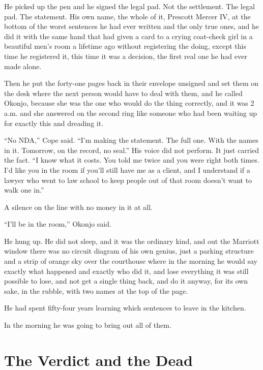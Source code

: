 \documentclass[11pt,openany]{book}
\begin{document}
He picked up the pen and he signed the legal pad. Not the settlement. The legal pad. The statement. His own name, the whole of it, Prescott Mercer IV, at the bottom of the worst sentences he had ever written and the only true ones, and he did it with the same hand that had given a card to a crying coat-check girl in a beautiful men's room a lifetime ago without registering the doing, except this time he registered it, this time it was a decision, the first real one he had ever made alone.

Then he put the forty-one pages back in their envelope unsigned and set them on the desk where the next person would have to deal with them, and he called Okonjo, because she was the one who would do the thing correctly, and it was 2 a.m. and she answered on the second ring like someone who had been waiting up for exactly this and dreading it.

``No NDA,'' Cope said. ``I'm making the statement. The full one. With the names in it. Tomorrow, on the record, no seal.'' His voice did not perform. It just carried the fact. ``I know what it costs. You told me twice and you were right both times. I'd like you in the room if you'll still have me as a client, and I understand if a lawyer who went to law school to keep people out of that room doesn't want to walk one in.''

A silence on the line with no money in it at all.

``I'll be in the room,'' Okonjo said.

He hung up. He did not sleep, and it was the ordinary kind, and out the Marriott window there was no circuit diagram of his own genius, just a parking structure and a strip of orange sky over the courthouse where in the morning he would say exactly what happened and exactly who did it, and lose everything it was still possible to lose, and not get a single thing back, and do it anyway, for its own sake, in the rubble, with two names at the top of the page.

He had spent fifty-four years learning which sentences to leave in the kitchen.

In the morning he was going to bring out all of them.

\clearpage
\chapter{The Verdict and the Dead}
\end{document}
